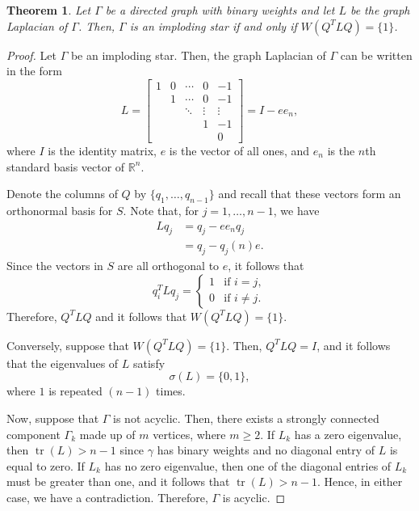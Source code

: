 \documentclass{article}
\newtheorem{theorem}{Theorem}[section]
\theoremstyle{definition}
\newcommand\tr[1]{\operatorname{tr}\left(#1\right)}
\begin{document}
\begin{theorem}\label{thm:imp-star}
Let $\Gamma$ be a directed graph with binary weights and let $L$ be the graph Laplacian of $\Gamma$.
Then, $\Gamma$ is an imploding star if and only if $W(Q^{T}LQ)=\{1\}$. 
\end{theorem}
\begin{proof}
Let $\Gamma$ be an imploding star.
Then, the graph Laplacian of $\Gamma$ can be written in the form
\[
L=\begin{bmatrix} 1 & 0 & \cdots & 0 & -1 \\ & 1 & \cdots & 0 & -1 \\ & & \ddots & \vdots & \vdots \\ & & & 1 & -1 \\ & & & & 0 \end{bmatrix} = I - ee_{n},
\]
where $I$ is the identity matrix, $e$ is the vector of all ones, and $e_{n}$ is the $n$th standard basis vector of $\mathbb{R}^{n}$.

Denote the columns of $Q$ by $\{q_{1},\ldots,q_{n-1}\}$ and recall that these vectors form an orthonormal basis for $S$.
Note that, for $j=1,\ldots,n-1$, we have
\begin{align*}
Lq_{j} &= q_{j} - ee_{n}q_{j} \\
&= q_{j} - q_{j}(n)e. 
\end{align*}
Since the vectors in $S$ are all orthogonal to $e$, it follows that
\[
q_{i}^{T}Lq_{j}=\begin{cases}
				1 & \text{if $i=j$}, \\
				0 & \text{if $i\neq j$}.
			\end{cases}
\]
Therefore, $Q^{T}LQ$ and it follows that $W(Q^{T}LQ)=\{1\}$. 

Conversely, suppose that $W(Q^{T}LQ)=\{1\}$. 
Then, $Q^{T}LQ=I$, and it follows that the eigenvalues of $L$ satisfy
\[
\sigma(L)=\{0,1\},
\]
where $1$ is repeated $(n-1)$ times.

Now, suppose that $\Gamma$ is not acyclic.
Then, there exists a strongly connected component $\Gamma_{k}$ made up of $m$ vertices, where $m\geq 2$. 
If $L_{k}$ has a zero eigenvalue, then $\tr{L}>n-1$ since $\gamma$ has binary weights and no diagonal entry of $L$ is equal to zero.
If $L_{k}$ has no zero eigenvalue, then one of the diagonal entries of $L_{k}$ must be greater than one, and it follows that $\tr{L}>n-1$. 
Hence, in either case, we have a contradiction.
Therefore, $\Gamma$ is acyclic. 


\end{proof}
\end{document}
